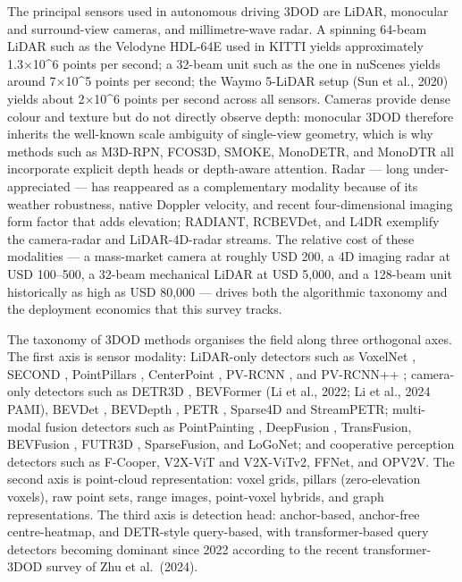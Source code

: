 \documentclass{article}
\begin{document}
The principal sensors used in autonomous driving 3DOD are LiDAR, monocular and surround-view cameras, and millimetre-wave radar. A spinning 64-beam LiDAR such as the Velodyne HDL-64E used in KITTI \citep{geiger2012arewereadyforauton} yields approximately 1.3×10\^{}6 points per second; a 32-beam unit such as the one in nuScenes \citep{caesar2020nuscenesamultimoda} yields around 7×10\^{}5 points per second; the Waymo 5-LiDAR setup (Sun et al., 2020) yields about 2×10\^{}6 points per second across all sensors. Cameras provide dense colour and texture but do not directly observe depth: monocular 3DOD therefore inherits the well-known scale ambiguity of single-view geometry, which is why methods such as M3D-RPN, FCOS3D, SMOKE, MonoDETR, and MonoDTR all incorporate explicit depth heads or depth-aware attention. Radar --- long under-appreciated --- has reappeared as a complementary modality because of its weather robustness, native Doppler velocity, and recent four-dimensional imaging form factor that adds elevation; RADIANT, RCBEVDet, and L4DR exemplify the camera-radar and LiDAR-4D-radar streams. The relative cost of these modalities --- a mass-market camera at roughly USD 200, a 4D imaging radar at USD 100--500, a 32-beam mechanical LiDAR at USD 5,000, and a 128-beam unit historically as high as USD 80,000 --- drives both the algorithmic taxonomy and the deployment economics that this survey tracks.

The taxonomy of 3DOD methods organises the field along three orthogonal axes. The first axis is sensor modality: LiDAR-only detectors such as VoxelNet \citep{zhou2017voxelnetendtoendle}, SECOND \citep{yan2018secondsparselyembe}, PointPillars \citep{lang2019pointpillarsfasten}, CenterPoint \citep{yin2021multimodalvirtualp}, PV-RCNN \citep{shi2019pointrcnn3dobjectp}, and PV-RCNN++ \citep{shi2022pvrcnnpointvoxelfe}; camera-only detectors such as DETR3D \citep{wang2022detr3d3dobjectdete}, BEVFormer (Li et al., 2022; Li et al., 2024 PAMI), BEVDet \citep{huang2021bevdethighperforma}, BEVDepth \citep{li2023bevdepthacquisitio}, PETR \citep{liu2022petrpositionembedd}, Sparse4D and StreamPETR; multi-modal fusion detectors such as PointPainting \citep{vora2020pointpaintingseque}, DeepFusion \citep{li2022bevformerlearningb}, TransFusion, BEVFusion \citep{liu2023bevfusionmultitask}, FUTR3D \citep{chen2023futr3daunifiedsens}, SparseFusion, and LoGoNet; and cooperative perception detectors such as F-Cooper, V2X-ViT and V2X-ViTv2, FFNet, and OPV2V. The second axis is point-cloud representation: voxel grids, pillars (zero-elevation voxels), raw point sets, range images, point-voxel hybrids, and graph representations. The third axis is detection head: anchor-based, anchor-free centre-heatmap, and DETR-style query-based, with transformer-based query detectors becoming dominant since 2022 according to the recent transformer-3DOD survey of Zhu et al.~(2024).
\end{document}
